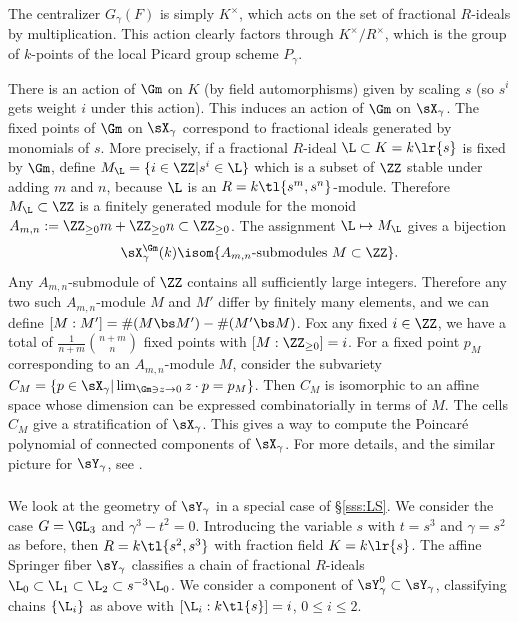 The centralizer $G_{\gamma}(F)$ is simply $K^{\times}$, which acts on the set of fractional $R$-ideals by multiplication. This action clearly factors through $K^{\times}/R^{\times}$, which is the group of $k$-points of the local Picard group scheme $P_{\gamma}$.

There is an action of $\Gm$ on $K$ (by field automorphisms) given by scaling $s$ (so $s^{i}$ gets weight $i$ under this action). This induces an action of $\Gm$ on $\sX_{\gamma}$. The fixed points of $\Gm$ on $\sX_{\gamma}$ correspond to fractional ideals generated by monomials of $s$. More precisely, if a fractional $R$-ideal $\L\subset K=k\lr{s}$ is fixed by $\Gm$,  define $M_{\L}=\{i\in\ZZ|s^{i}\in \L\}$ which is a subset of $\ZZ$ stable under adding $m$ and $n$, because $\L$ is an $R=k\tl{s^{m},s^{n}}$-module. Therefore $M_{\L}\subset\ZZ$ is a finitely generated module for the monoid $A_{m,n}:=\ZZ_{\geq 0}m+\ZZ_{\geq0}n\subset\ZZ_{\geq 0}$. The assignment $\L\mapsto M_{\L}$ gives a bijection
\begin{equation*}
\sX_{\gamma}^{\Gm}(k)\isom\{\mbox{$A_{m,n}$-submodules $M\subset \ZZ$}\}.
\end{equation*}
Any $A_{m,n}$-submodule of $\ZZ$ contains all sufficiently large integers. Therefore any two such $A_{m,n}$-module $M$ and $M'$ differ by finitely many elements, and we can define $[M:M']=\#(M\bs M')-\#(M'\bs M)$. Fox any fixed $i\in\ZZ$, we have a total of $\frac{1}{n+m}\binom{n+m}{n}$ fixed points with $[M:\ZZ_{\geq0}]=i$. For a fixed point $p_{M}$ corresponding to an $A_{m,n}$-module $M$, consider the subvariety $C_{M}=\{p\in\sX_{\gamma}|\lim_{\Gm\ni z\to0}z\cdot p=p_{M}\}$. Then $C_{M}$ is isomorphic to an affine space whose dimension can be expressed combinatorially in terms of $M$. The cells $C_{M}$ give a stratification of $\sX_{\gamma}$. This gives a way to compute the Poincar\'e polynomial of connected components of $\sX_{\gamma}$. For more details, and the similar picture for $\sY_{\gamma}$, see \cite{LS}.

\subsubsection{} We look at the geometry of $\sY_{\gamma}$ in a special case of \S\ref{sss:LS}. We consider the case $G=\GL_{3}$ and $\gamma^{3}-t^{2}=0$. Introducing the variable $s$ with $t=s^{3}$ and $\gamma=s^{2}$ as before, then $R=k\tl{s^{2},s^{3}}$ with fraction field $K=k\lr{s}$. The affine Springer fiber  $\sY_{\gamma}$ classifies a chain of fractional $R$-ideals $\L_{0}\subset \L_{1}\subset \L_{2}\subset s^{-3}\L_{0}$.  We consider a component of $\sY^{0}_{\gamma}\subset\sY_{\gamma}$, classifying chains $\{\L_{i}\}$ as above with $[\L_{i}:k\tl{s}]=i$, $0\leq i\leq 2$. 


